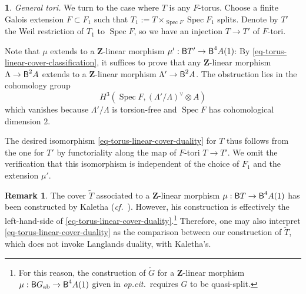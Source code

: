 \documentclass[10pt,english,reqno]{amsart}
\newcommand{\integers}{\mathbf Z}
\newcommand{\deloop}{\textnormal{\textsf{B}}}
\newcommand{\Spec}{\operatorname{Spec}}
\newcommand{\abelian}{\textnormal{ab}}
\theoremstyle{definition}
\newtheorem{rem}[subsubsection]{Remark}
\numberwithin{equation}{section}
\newtheorem{untitledsubsubsection}[subsubsection]{}
\newenvironment{void}
{\begin{untitledsubsubsection}}
{\end{untitledsubsubsection}}
\begin{document}

\begin{void}\emph{General tori.}
We turn to the case where $T$ is any $F$-torus. Choose a finite Galois extension $F \subset F_1$ such that $T_1 := T\times_{\Spec F}\Spec F_1$ splits. Denote by $T'$ the Weil restriction of $T_1$ to $\Spec F$, so we have an injection $T \rightarrow T'$ of $F$-tori.

Note that $\mu$ extends to a $\integers$-linear morphism $\mu' : \deloop T' \rightarrow \deloop^4A(1)$: By \eqref{eq-torus-linear-cover-classification}, it suffices to prove that any $\integers$-linear morphism $\Lambda \rightarrow \deloop^2A$ extends to a $\integers$-linear morphism $\Lambda' \rightarrow \deloop^2 A$. The obstruction lies in the cohomology group
$$
H^3(\Spec F, (\Lambda'/\Lambda)^{\vee} \otimes A)
$$
which vanishes because $\Lambda'/\Lambda$ is torsion-free and $\Spec F$ has cohomological dimension $2$.

The desired isomorphism \eqref{eq-torus-linear-cover-duality} for $T$ thus follows from the one for $T'$ by functoriality along the map of $F$-tori $T \rightarrow T'$. We omit the verification that this isomorphism is independent of the choice of $F_1$ and the extension $\mu'$.
\end{void}


\begin{rem}
The cover $\widetilde T$ associated to a $\integers$-linear morphism $\mu : \deloop T \rightarrow \deloop^4A(1)$ has been constructed by Kaletha (\emph{cf.}~\cite[\S2.2]{kaletha2022}). However, his construction is effectively the left-hand-side of \eqref{eq-torus-linear-cover-duality}.\footnote{For this reason, the construction of $\widetilde G$ for a $\integers$-linear morphism $\mu : \deloop G_{\abelian} \rightarrow \deloop^4A(1)$ given in \emph{op.cit.}~requires $G$ to be quasi-split.} Therefore, one may also interpret \eqref{eq-torus-linear-cover-duality} as the comparison between our construction of $\widetilde T$, which does not invoke Langlands duality, with Kaletha's.
\end{rem}

\end{document}
